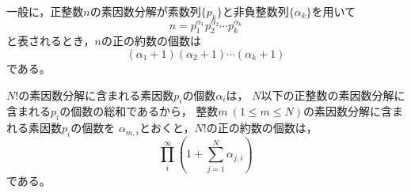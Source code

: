 \documentclass{article}
\begin{document}
一般に，正整数$n$の素因数分解が素数列$\{p_k\}$と非負整数列$\{\alpha_k\}$を用いて
$$n = p_1^{\alpha_1} p_2^{\alpha_2} \cdots p_k^{\alpha_k}$$
と表されるとき，$n$の正の約数の個数は
$$(\alpha_1 + 1) (\alpha_2 + 1) \cdots (\alpha_k + 1)$$
である。

$N!$の素因数分解に含まれる素因数$p_i$の個数$\alpha_i$は，
$N$以下の正整数の素因数分解に含まれる$p_i$の個数の総和であるから，
整数$m\ (1 \leq m \leq N)$の素因数分解に含まれる素因数$p_i$の個数を
$\alpha_{m, i}$とおくと，$N!$の正の約数の個数は，
\begin{equation}
    \prod_{i}^\infty ( 1 + \sum_{j = 1}^N \alpha_{j, i} ) \nonumber
\end{equation}
である。
\end{document}
